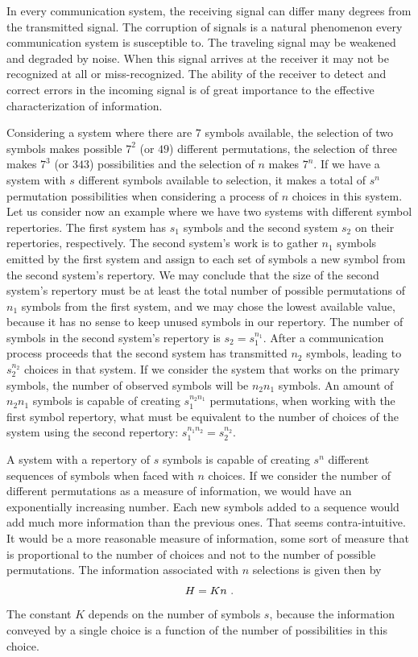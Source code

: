 In every communication system, the receiving signal can differ many degrees from the transmitted signal. 
The corruption of signals is a natural phenomenon every communication system is susceptible to. 
The traveling signal may be weakened and degraded by noise. When this signal arrives at the receiver it 
may not be recognized at all or miss-recognized. The ability of the receiver to detect and correct errors 
in the incoming signal is of great importance to the effective characterization of information.

Considering a system where there are $7$ symbols available, the selection of two symbols makes 
possible $7^2$ (or $49$) different permutations, the selection of three makes $7^3$ (or $343$) possibilities 
and the selection of $n$ makes $7^n$. If we have a system with $s$ different symbols available to selection, 
it makes a total of $s^n$ permutation possibilities when considering a process of $n$ choices in this system.
Let us consider now an example where we have two systems with different symbol repertories. 
The first system has $s_1$ symbols and the second system $s_2$ on their repertories, respectively. 
The second system's work is to gather $n_1$ symbols emitted by the first system and assign to each set of symbols 
a new symbol from the second system's repertory. We may conclude that the size of the second system's repertory 
must be at least the total number of possible permutations of $n_1$ symbols from the first system, 
and we may chose the lowest available value, because it has no sense to keep unused symbols in our repertory. 
The number of symbols in the second system's repertory is $s_2 = s_1^{n_1}$. After a communication process proceeds 
that the second system has transmitted $n_2$ symbols, leading to $s_2^{n_2}$ choices in that system. 
If we consider the system that works on the primary symbols, the number of observed symbols will be $n_2 n_1$ symbols. 
An amount of $n_2 n_1$ symbols is capable of creating $s_1^{n_2 n_1}$ permutations, when working with the first symbol
repertory, what must be equivalent to the number of choices of the system using the second repertory: 
$s_1^{n_1 n_2} = s_2^{n_2}$.

A system with a repertory of $s$ symbols is capable of creating $s^n$ different sequences of symbols when faced 
with $n$ choices. If we consider the number of different permutations as a measure of information, 
we would have an exponentially increasing number. Each new symbols added to a sequence would add much more information 
than the previous ones. That seems contra-intuitive. It would be a more reasonable measure of information, 
some sort of measure that is proportional to the number of choices and not to the number of possible permutations. 
The information associated with $n$ selections is given then by
\begin{equation}
H = K n \textmd{ .}
\label{eq:HKn}
\end{equation}
The constant $K$ depends on the number of symbols $s$, because the information conveyed by a single choice is a 
function of the number of possibilities in this choice.


